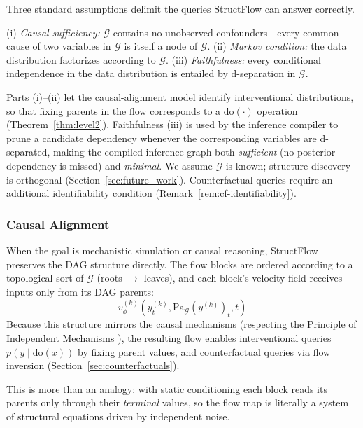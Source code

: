 Three standard assumptions delimit the queries StructFlow can answer correctly.

\begin{assumption}
\label{ass:standard}
(i) \emph{Causal sufficiency:} $\mathcal{G}$ contains no unobserved confounders---every common cause of two variables in $\mathcal{G}$ is itself a node of $\mathcal{G}$. (ii) \emph{Markov condition:} the data distribution factorizes according to $\mathcal{G}$. (iii) \emph{Faithfulness:} every conditional independence in the data distribution is entailed by d-separation in $\mathcal{G}$.
\end{assumption}

Parts (i)--(ii) let the causal-alignment model identify interventional distributions, so that fixing parents in the flow corresponds to a $\mathrm{do}(\cdot)$ operation (Theorem~\ref{thm:level2}). Faithfulness (iii) is used by the inference compiler to prune a candidate dependency whenever the corresponding variables are d-separated, making the compiled inference graph both \emph{sufficient} (no posterior dependency is missed) and \emph{minimal}. We assume $\mathcal{G}$ is known; structure discovery is orthogonal (Section~\ref{sec:future_work}). Counterfactual queries require an additional identifiability condition (Remark~\ref{rem:cf-identifiability}).

\subsubsection{Causal Alignment}
When the goal is mechanistic simulation or causal reasoning, StructFlow preserves the DAG structure directly. The flow blocks are ordered according to a topological sort of $\mathcal{G}$ (roots $\to$ leaves), and each block's velocity field receives inputs only from its DAG parents:
\begin{equation}
    v^{(k)}_\phi(y^{(k)}_t, \mathrm{Pa}_\mathcal{G}(y^{(k)})_t, t)
\end{equation}
Because this structure mirrors the causal mechanisms (respecting the Principle of Independent Mechanisms \citep{Peters2017}), the resulting flow enables interventional queries $p(y \mid \mathrm{do}(x))$ by fixing parent values, and counterfactual queries via flow inversion (Section~\ref{sec:counterfactuals}).

This is more than an analogy: with static conditioning each block reads its parents only through their \emph{terminal} values, so the flow map is literally a system of structural equations driven by independent noise.

